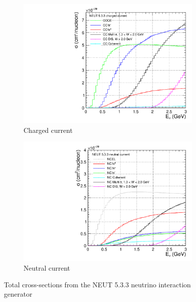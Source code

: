 \begin{figure}[h]
	\centering
	\begin{subfigure}[t]{0.42\textwidth}
		\includegraphics[width=\textwidth, trim={0mm 0mm 0mm 0mm}, clip,page=1]{figures/niwg/NEUT_533_xsecs}
		\caption{Charged current}
	\end{subfigure}
	\begin{subfigure}[t]{0.42\textwidth}
		\includegraphics[width=\textwidth, trim={0mm 0mm 0mm 0mm}, clip,page=1]{figures/niwg/NEUT_533_xsecs_NC}
		\caption{Neutral current}
	\end{subfigure}
	\caption{Total cross-sections from the NEUT 5.3.3\cite{neut} neutrino interaction generator}
	\label{fig:neut_xsecs}
\end{figure}

